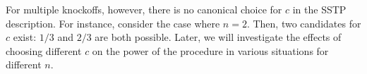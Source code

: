 \documentclass[11pt,reqno]{report}
\theoremstyle{definition}
\numberwithin{equation}{section}
\begin{document}
For multiple knockoffs, however, there is no canonical choice for $c$ in the SSTP description. For instance, consider the case where $n = 2$. Then, two candidates for $c$ exist: $1/3$ and $2/3$ are both possible. Later, we will investigate the effects of choosing different $c$ on the power of the procedure in various situations for different $n$. 



\end{document}
